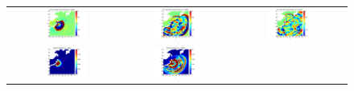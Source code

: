\begin{figure}[h]
        \begin{tabular}{ccc}
\hspace*{-65pt}
\includegraphics[width=0.45\textwidth]{./figures/mean2d1.pdf} &
\hspace*{-65pt}
\includegraphics[width=0.45\textwidth]{./figures/mean2d3.pdf} &
\hspace*{-65pt}
\includegraphics[width=0.45\textwidth]{./figures/mean2d4.pdf} \\
\hspace*{-65pt}
\includegraphics[width=0.45\textwidth]{./figures/sigma2d1.pdf} &
\hspace*{-65pt}
\includegraphics[width=0.45\textwidth]{./figures/sigma2d3.pdf} &

\end{tabular}
\end{figure}
